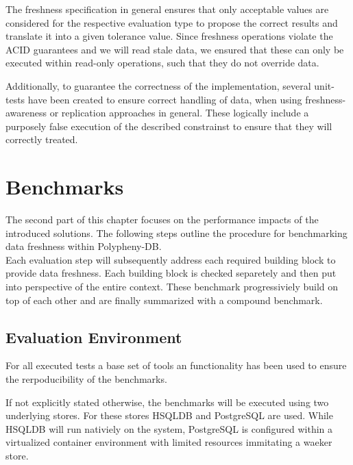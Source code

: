 The freshness specification in general ensures that only acceptable values are considered for the respective evaluation type to propose the correct results and translate it into
a given tolerance value.
Since freshness operations violate the ACID guarantees and we will read stale data, we ensured that these can only be executed within read-only operations, 
such that they do not override data.


Additionally, to guarantee the correctness of the implementation, several unit-tests have 
been created to ensure correct handling of data, when using freshness-awareness or replication approaches in general.
These logically include a purposely false execution of the described constrainst to ensure that they will correctly treated.\\




\section{Benchmarks}

The second part of this chapter focuses on the performance impacts of the introduced solutions.
The following steps outline the procedure for benchmarking data freshness within Polypheny-DB.\\
Each evaluation step will subsequently address each required building block to provide data freshness.
Each building block is checked separetely and then put into perspective of the entire context.
These benchmark progressiviely build on top of each other and are finally summarized with a compound benchmark.\\




\subsection{Evaluation Environment}
\label{sec:env}

For all executed tests a base set of tools an functionality has been used to ensure the rerpoducibility of the benchmarks.

If not explicitly stated otherwise, the benchmarks will be executed using two underlying stores.
For these stores HSQLDB and PostgreSQL are used. While HSQLDB will run nativiely on the system, PostgreSQL is configured within a virtualized
container environment with limited resources immitating a waeker store. \\

